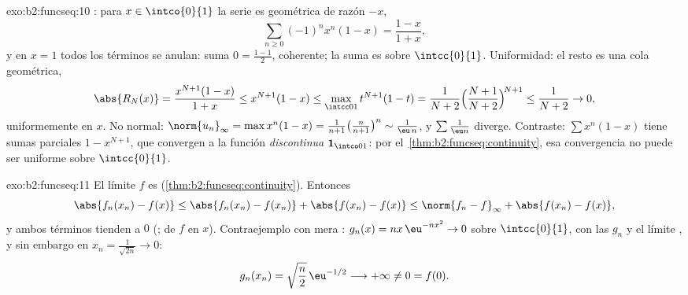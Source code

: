 \begin{solution}{exo:b2:funcseq:10}
: para $x \in \intco{0}{1}$ la serie es geométrica de
razón $-x$,
\[
\sum_{n\geq0}(-1)^n x^n(1-x) = \frac{1-x}{1+x},
\]
y en $x = 1$ todos los términos se anulan: suma $0 =
\frac{1-1}{2}$, coherente; la suma es  sobre
$\intcc{0}{1}$. Uniformidad: el resto es una cola geométrica,
\[
\abs{R_N(x)} = \frac{x^{N+1}(1-x)}{1+x} \leq x^{N+1}(1 - x)
\leq \max_{\intcc01} t^{N+1}(1-t)
= \frac{1}{N+2}\Bigl(\frac{N+1}{N+2}\Bigr)^{\!N+1}
\leq \frac{1}{N+2} \to 0 ,
\]
uniformemente en $x$. No normal: $\norm{u_n}_\infty = \max x^n(1-x)
= \frac{1}{n+1}\bigl(\frac{n}{n+1}\bigr)^n \sim \frac{1}{\eu\,n}$, y
$\sum \frac1{\eu n}$ diverge. Contraste: $\sum x^n(1-x)$ tiene sumas
parciales $1 - x^{N+1}$, que convergen  a la función
\emph{discontinua} $\mathbf 1_{\intco01}$: por el~\cref{thm:b2:funcseq:continuity}, esa convergencia no puede ser
uniforme sobre $\intcc{0}{1}$.
\end{solution}

\begin{solution}{exo:b2:funcseq:11}
El límite $f$ es  (\cref{thm:b2:funcseq:continuity}).
Entonces
\[
\abs{f_n(x_n) - f(x)}
\leq \abs{f_n(x_n) - f(x_n)} + \abs{f(x_n) - f(x)}
\leq \norm{f_n - f}_\infty + \abs{f(x_n) - f(x)} ,
\]
y ambos términos tienden a $0$ (;
 de $f$ en $x$). Contraejemplo con mera
: $g_n(x) = nx\,\eu^{-nx^2} \to 0$
 sobre $\intcc{0}{1}$, con las $g_n$ y el límite
, y sin embargo en $x_n = \frac{1}{\sqrt{2n}} \to 0$:
\[
g_n(x_n) = \sqrt{\frac n2}\,\eu^{-1/2} \longrightarrow +\infty
\neq 0 = f(0) .
\]
\end{solution}


